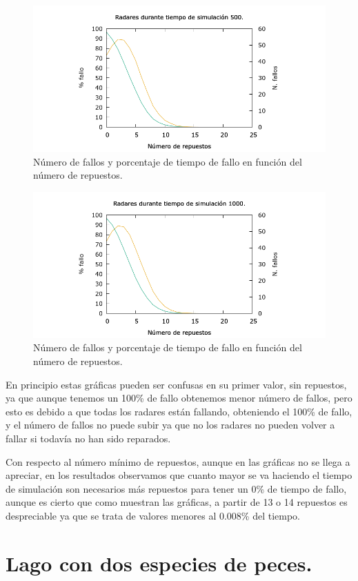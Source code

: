 \documentclass[12pt, spanish]{article}
\begin{document}
\begin{figure}[H]
	\centering
	\includegraphics[scale = 0.6]{radares_500.png}
	\caption{Número de fallos y porcentaje de tiempo de fallo en función del número de repuestos.}
	\label{fig:ej4}
\end{figure}

\begin{figure}[H]
	\centering
	\includegraphics[scale = 0.6]{radares_1000.png}
	\caption{Número de fallos y porcentaje de tiempo de fallo en función del número de repuestos.}
	\label{fig:ej4}
\end{figure}


En principio estas gráficas pueden ser confusas en su primer valor, sin repuestos, ya que aunque tenemos un 100\% de fallo obtenemos menor número de fallos, pero esto es debido a que todas los radares están fallando, obteniendo el 100\% de fallo, y el número de fallos no puede subir ya que no los radares no pueden volver a fallar si todavía no han sido reparados.

Con respecto al número mínimo de repuestos, aunque en las gráficas no se llega a apreciar, en los resultados observamos que cuanto mayor se va haciendo el tiempo de simulación son necesarios más repuestos para tener un 0\% de tiempo de fallo, aunque es cierto que como muestran las gráficas, a partir de 13 o 14 repuestos es despreciable ya que se trata de valores menores al 0.008\% del tiempo.





\section{Lago con dos especies de peces.}

\newpage


\begin{thebibliography}{9}


\end{thebibliography}
\end{document}
